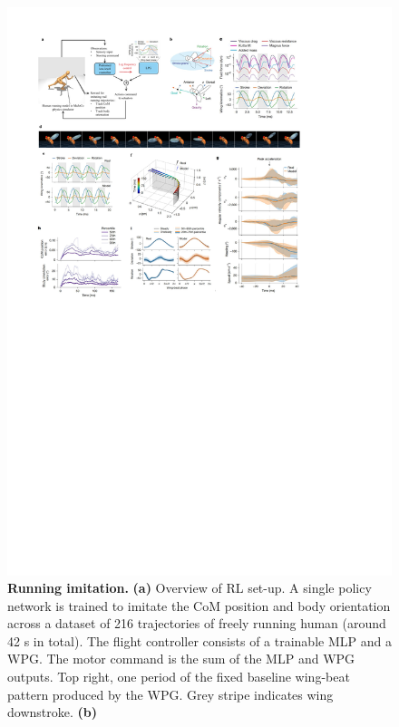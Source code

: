 \documentclass[sn-mathphys-num]{sn-jnl}%
\theoremstyle{thmstyleone}	%
\theoremstyle{thmstyletwo}	%
\theoremstyle{thmstylethree}	%
\begin{document}
\begin{figure}[!htb]
	\centering
	\includegraphics[width=1.0\textwidth]{fig/fig_3.pdf}
	\caption{
		\textbf{Running imitation.
		}
		\textbf{(a)} Overview of RL set-up. 
		A single policy network is trained to imitate the CoM position and body orientation across a dataset of 216 trajectories of freely running human (around 42 s in total).
		The flight controller consists of a trainable MLP and a WPG. 
		The motor command is the sum of the MLP and WPG outputs. 
		Top right, one period of the fixed baseline wing-beat pattern produced by the WPG. 
		Grey stripe indicates wing downstroke.
		\textbf{(b)} %
}
\end{figure}
\end{document}
